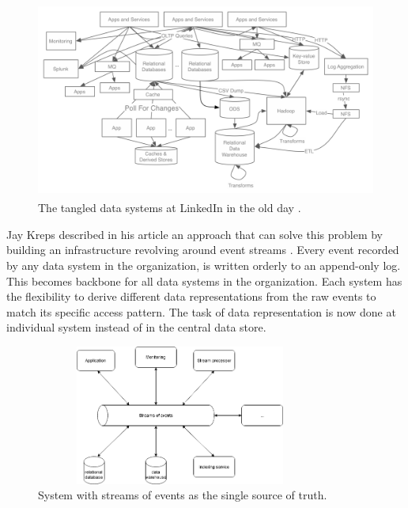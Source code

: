 \begin{figure}[h]
	\centering
	\includegraphics[width=12cm,height=6.5cm]{images/linkedin-data-flow-ugly.png}
	\caption{The tangled data systems at LinkedIn in the old day \cite{eventstreamingplatform}.}
	\label{fig:tangledsystem}
\end{figure}

Jay Kreps described in his article an approach that can solve this problem by building an infrastructure revolving around event streams \cite{logjaykreps}. Every event recorded by any data system in the organization, is written orderly to an append-only log. This becomes backbone for all data systems in the organization. Each system has the flexibility to derive different data representations from the raw events to match its specific access pattern. The task of data representation is now done at individual system instead of in the central data store. 

\begin{figure}[h]
	\centering
	\includegraphics[width=9.5cm,height=4.6cm]{images/eventstreamprocessing.png}
	\caption{System with streams of events as the single source of truth.}
	\label{fig:eventstreamprocessingsystem}
\end{figure}

